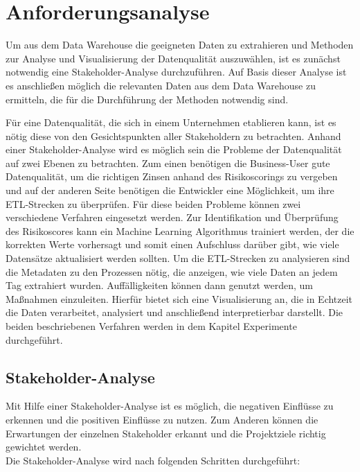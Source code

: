 \chapter{Anforderungsanalyse}\label{ch:anforderungen}
Um aus dem Data Warehouse die geeigneten Daten zu extrahieren und Methoden zur Analyse und Visualisierung der Datenqualität auszuwählen, ist es zunächst notwendig eine Stakeholder-Analyse durchzuführen. 
Auf Basis dieser Analyse ist es anschließen möglich die relevanten Daten aus dem Data Warehouse zu ermitteln, die für die Durchführung der Methoden notwendig sind. 



Für eine Datenqualität, die sich in einem Unternehmen etablieren kann, ist es nötig diese von den Gesichtspunkten aller Stakeholdern zu betrachten.
Anhand einer Stakeholder-Analyse wird es möglich sein die Probleme der Datenqualität auf zwei Ebenen zu betrachten. 
Zum einen benötigen die Business-User gute Datenqualität, um die richtigen Zinsen anhand des Risikoscorings zu vergeben und auf der anderen Seite benötigen die Entwickler eine Möglichkeit, um ihre ETL-Strecken zu überprüfen.
Für diese beiden Probleme können zwei verschiedene Verfahren eingesetzt werden.
Zur Identifikation und Überprüfung des Risikoscores kann ein Machine Learning Algorithmus trainiert werden, der die korrekten Werte vorhersagt und somit einen Aufschluss darüber gibt, wie viele Datensätze aktualisiert werden sollten.
Um die ETL-Strecken zu analysieren sind die Metadaten zu den Prozessen nötig, die anzeigen, wie viele Daten an jedem Tag extrahiert wurden. 
Auffälligkeiten können dann genutzt werden, um Maßnahmen einzuleiten.
Hierfür bietet sich eine Visualisierung an, die in Echtzeit die Daten verarbeitet, analysiert und anschließend interpretierbar darstellt.
Die beiden beschriebenen Verfahren werden in dem Kapitel Experimente durchgeführt. 



\section{Stakeholder-Analyse}
\label{sec:Stakeholder-Analyse} 
Mit Hilfe einer Stakeholder-Analyse ist es möglich, die negativen Einflüsse zu erkennen und die positiven Einflüsse zu nutzen.
Zum Anderen können die Erwartungen der einzelnen Stakeholder erkannt und die Projektziele richtig gewichtet werden. \\
Die Stakeholder-Analyse wird nach folgenden Schritten durchgeführt: 

